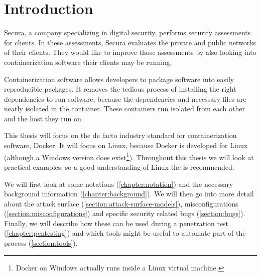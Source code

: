 \chapter{Introduction}
Secura, a company specializing in digital security, performs security assessments for clients. In these assessments, Secura evaluates the private and public networks of their clients. They would like to improve those assessments by also looking into containerization software their clients may be running.

\hfill

Containerization software allows developers to package software into easily reproducible packages. It removes the tedious process of installing the right dependencies to run software, because the dependencies and necessary files are neatly isolated in the container. These containers run isolated from each other and the host they run on.

\hfill

This thesis will focus on the de facto industry standard for containerization software, Docker. It will focus on Linux, because Docker is developed for Linux (although a Windows version does exist\footnote{Docker on Windows actually runs inside a Linux virtual machine.}). Throughout this thesis we will look at practical examples, so a good understanding of Linux the is recommended.

\hfill

We will first look at some notations (\autoref{chapter:notation}) and the necessary background information (\autoref{chapter:background}). We will then go into more detail about the attack surface (\autoref{section:attack-surface-models}), misconfigurations (\autoref{section:misconfigurations}) and specific security related bugs (\autoref{section:bugs}). Finally, we will describe how these can be used during a penetration test (\autoref{chapter:pentesting}) and which tools might be useful to automate part of the process (\autoref{section:tools}).
